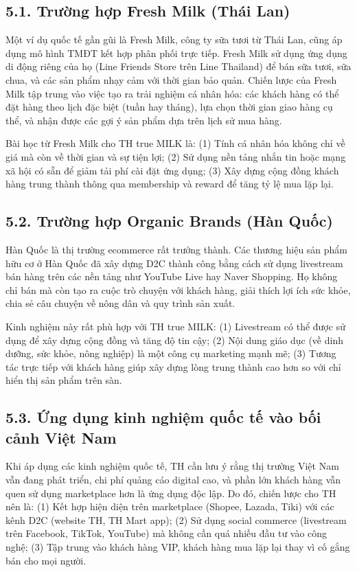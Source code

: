 \subsection*{5.1. Trường hợp Fresh Milk (Thái Lan)}
Một ví dụ quốc tế gần gũi là Fresh Milk, công ty sữa tươi từ Thái Lan, cũng áp dụng mô hình TMĐT kết hợp phân phối trực tiếp. Fresh Milk sử dụng ứng dụng di động riêng của họ (Line Friends Store trên Line Thailand) để bán sữa tươi, sữa chua, và các sản phẩm nhạy cảm với thời gian bảo quản. Chiến lược của Fresh Milk tập trung vào việc tạo ra trải nghiệm cá nhân hóa: các khách hàng có thể đặt hàng theo lịch đặc biệt (tuần hay tháng), lựa chọn thời gian giao hàng cụ thể, và nhận được các gợi ý sản phẩm dựa trên lịch sử mua hàng.

Bài học từ Fresh Milk cho TH true MILK là: (1) Tính cá nhân hóa không chỉ về giá mà còn về thời gian và sự tiện lợi; (2) Sử dụng nền tảng nhắn tin hoặc mạng xã hội có sẵn để giảm tải phí cài đặt ứng dụng; (3) Xây dựng cộng đồng khách hàng trung thành thông qua membership và reward để tăng tỷ lệ mua lặp lại.

\subsection*{5.2. Trường hợp Organic Brands (Hàn Quốc)}
Hàn Quốc là thị trường ecommerce rất trưởng thành. Các thương hiệu sản phẩm hữu cơ ở Hàn Quốc đã xây dựng D2C thành công bằng cách sử dụng livestream bán hàng trên các nền tảng như YouTube Live hay Naver Shopping. Họ không chỉ bán mà còn tạo ra cuộc trò chuyện với khách hàng, giải thích lợi ích sức khỏe, chia sẻ câu chuyện về nông dân và quy trình sản xuất.

Kinh nghiệm này rất phù hợp với TH true MILK: (1) Livestream có thể được sử dụng để xây dựng cộng đồng và tăng độ tin cậy; (2) Nội dung giáo dục (về dinh dưỡng, sức khỏe, nông nghiệp) là một công cụ marketing mạnh mẽ; (3) Tương tác trực tiếp với khách hàng giúp xây dựng lòng trung thành cao hơn so với chỉ hiển thị sản phẩm trên sàn.

\subsection*{5.3. Ứng dụng kinh nghiệm quốc tế vào bối cảnh Việt Nam}
Khi áp dụng các kinh nghiệm quốc tế, TH cần lưu ý rằng thị trường Việt Nam vẫn đang phát triển, chi phí quảng cáo digital cao, và phần lớn khách hàng vẫn quen sử dụng marketplace hơn là ứng dụng độc lập. Do đó, chiến lược cho TH nên là: (1) Kết hợp hiện diện trên marketplace (Shopee, Lazada, Tiki) với các kênh D2C (website TH, TH Mart app); (2) Sử dụng social commerce (livestream trên Facebook, TikTok, YouTube) mà không cần quá nhiều đầu tư vào công nghệ; (3) Tập trung vào khách hàng VIP, khách hàng mua lặp lại thay vì cố gắng bán cho mọi người.

